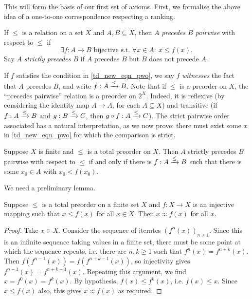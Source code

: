 This will form the basis of our first set of axioms. First, we formalise the
above idea of a one-to-one correspondence respecting a ranking.

\begin{definition}
    If $\le$ is a relation on a set $X$ and $A, B \subseteq X$, then $A$
    \emph{precedes $B$ pairwise} with respect to $\le$ if
    \begin{equation}
        \label{td_new_eqn_pwo}
        \exists f: A \to B \text{ bijective s.t. }
        \forall x \in A:\ x \le f(x).
    \end{equation}
    Say $A$ \emph{strictly precedes $B$} if $A$ precedes $B$ but $B$ does not
    precede $A$.
\end{definition}

If $f$ satisfies the condition in \cref{td_new_eqn_pwo}, we say $f$
\emph{witnesses} the fact that $A$ precedes $B$, and write
${f}:{A} \xrightarrow{\le} {B}$.  Note that if $\le$ is a preorder on $X$, the
``precedes pairwise'' relation is a preorder on $2^X$.  Indeed, it is reflexive
(by considering the identity map $A \to A$, for each $A \subseteq X$) and
transitive (if ${f}:{A} \xrightarrow{\le} {B}$ and ${g}:{B} \xrightarrow{\le} {C}$, then
${g \circ f}:{A} \xrightarrow{\le} {C}$). The strict pairwise order associated has a
natural interpretation, as we now prove: there must exist some $x$ in
\cref{td_new_eqn_pwo} for which the comparison is strict.

\begin{proposition}
    \label{td_new_prop_pwo_strict_part}
    Suppose $X$ is finite and $\le$ is a total preorder on $X$. Then $A$
    strictly precedes $B$ pairwise with respect to $\le$ if and only if there
    is ${f}:{A} \xrightarrow{\le} {B}$ such that there is some $x_0 \in A$ with $x_0 <
    f(x_0)$.
\end{proposition}

We need a  preliminary lemma.

\begin{lemma}
    \label{td_new_lemma_pwo_strict_helper}
    Suppose $\le$ is a total preorder on a finite set $X$ and $f: X \to X$ is
    an injective mapping such that $x \le f(x)$ for all $x \in X$. Then $x
    \approx f(x)$ for all $x$.
\end{lemma}

\begin{proof}
    Take $x \in X$. Consider the sequence of iterates $(f^n(x))_{n \ge 1}$.
    Since this is an infinite sequence taking values in a finite set, there
    must be some point at which the sequence repeats, i.e. there are $n, k \ge
    1$ such that $f^n(x) = f^{n + k}(x)$. Then $f(f^{n - 1}(x)) = f(f^{n + k -
    1}(x))$, so injectivity gives $f^{n - 1}(x) = f^{n + k - 1}(x)$. Repeating
    this argument, we find $x = f^0(x) = f^k(x)$. By hypothesis, $f(x) \le
    f^k(x)$, i.e. $f(x) \le x$. Since $x \le f(x)$ also, this gives $x \approx
    f(x)$ as required.
\end{proof}

